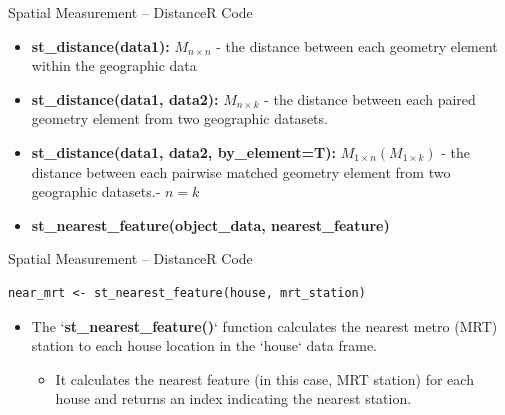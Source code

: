 \documentclass[hyperref={pdfpagelabels=false}]{beamer}
\begin{document}
\begin{frame}{Spatial Measurement -- Distance}{R Code}


\small

\begin{itemize}
	\item \textbf{st\_distance(data1):} $M_{n \times n}$
	- the distance between each geometry element within the geographic data
			\vspace{0.2cm}
	\item \textbf{st\_distance(data1, data2):} $M_{n \times k}$
	- the distance between each paired geometry element from two geographic datasets.
			\vspace{0.2cm}
	\item \textbf{st\_distance(data1, data2, by\_element=T):} $M_{1 \times n}(M_{1 \times k})$
	- the distance between each pairwise matched geometry element from two geographic datasets.- $n = k$
			\vspace{0.2cm}
	\item \textbf{st\_nearest\_feature(object\_data, nearest\_feature)}
\end{itemize}
\end{frame}


\begin{frame}[fragile]{Spatial Measurement -- Distance}{R Code}
\begin{lstlisting}
near_mrt <- st_nearest_feature(house, mrt_station)
\end{lstlisting}

\begin{itemize}
	\item The `\textbf{st\_nearest\_feature()}` function calculates the nearest metro (MRT) station to each house location in the `house` data frame.
	\vspace{0.2cm}
	\begin{itemize}
		\item It calculates the nearest feature (in this case, MRT station) for each house and returns an index indicating the nearest station.
	\end{itemize}
\end{itemize}
\end{frame}
\end{document}
